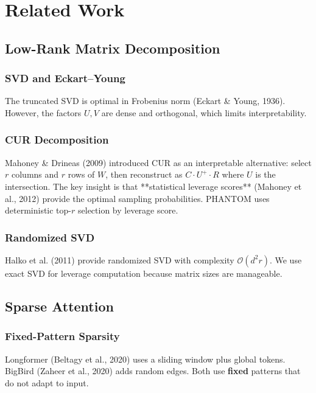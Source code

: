 
\section{Related Work}

\subsection{Low-Rank Matrix Decomposition}

\subsubsection{SVD and Eckart--Young}

The truncated SVD is optimal in Frobenius norm (Eckart \& Young, 1936). However, 
the factors $U, V$ are dense and orthogonal, which limits interpretability.

\subsubsection{CUR Decomposition}

Mahoney \& Drineas (2009) introduced CUR as an interpretable alternative: 
select $r$ columns and $r$ rows of $W$, then reconstruct as $C \cdot U^+ \cdot R$ 
where $U$ is the intersection. The key insight is that **statistical leverage 
scores** (Mahoney et al., 2012) provide the optimal sampling probabilities. 
PHANTOM uses deterministic top-$r$ selection by leverage score.

\subsubsection{Randomized SVD}

Halko et al. (2011) provide randomized SVD with complexity 
$\mathcal{O}(d^2 r)$. We use exact SVD for leverage computation because 
matrix sizes are manageable.

\subsection{Sparse Attention}

\subsubsection{Fixed-Pattern Sparsity}

Longformer (Beltagy et al., 2020) uses a sliding window plus global tokens. 
BigBird (Zaheer et al., 2020) adds random edges. Both use \textbf{fixed} patterns 
that do not adapt to input.

